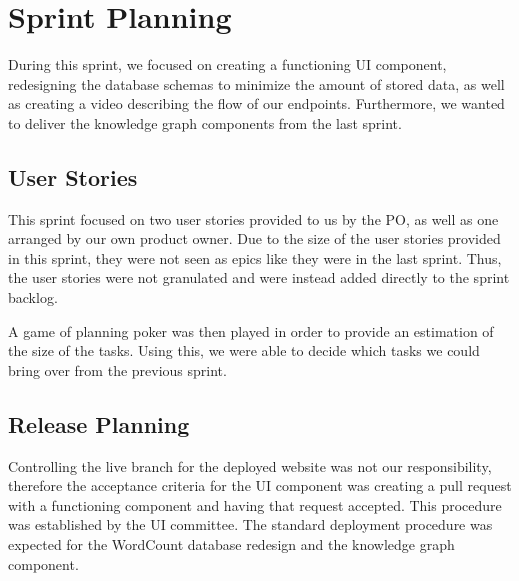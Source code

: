 \section{Sprint Planning}
During this sprint, we focused on creating a functioning UI component, redesigning the database schemas to minimize the amount of stored data, as well as creating a video describing the flow of our endpoints. Furthermore, we wanted to deliver the knowledge graph components from the last sprint. 

\subsection*{User Stories}
This sprint focused on two user stories provided to us by the \knox{} PO, as well as one arranged by our own product owner. 
Due to the size of the user stories provided in this sprint, they were not seen as epics like they were in the last sprint. Thus, the user stories were not granulated and were instead added directly to the sprint backlog.  


A game of planning poker was then played in order to provide an estimation of the size of the tasks. 
Using this, we were able to decide which tasks we could bring over from the previous sprint.

\subsection*{Release Planning}
Controlling the live branch for the deployed \knox{} website was not our responsibility, therefore the acceptance criteria for the UI component was creating a pull request with a functioning component and having that request accepted.
This procedure was established by the UI committee. 
The standard deployment procedure was expected for the WordCount database redesign and the knowledge graph component.